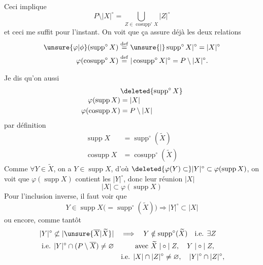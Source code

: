 \clearpage
{}

Ceci implique
\[
P\setminus|X|^{\circ}=\bigcup_{Z\in\operatorname{cosupp}^{\circ}X}|Z|^{\circ}
\]
et ceci me suffit pour l'instant. On voit que ça assure déjà les deux relations
\[
\begin{aligned}
\unsure{\varphi|\phi}(\operatorname{supp}^{\circ}X)&\overset{\mathrm{def}}{=}\unsure{\lvert}\operatorname{supp}^{\circ}X|^{\circ}=|X|^{\circ}\\
\varphi(\operatorname{cosupp}^{\circ}X)&\overset{\mathrm{def}}{=}|\operatorname{cosupp}^{\circ}X|^{\circ}=P\setminus|X|^{\circ}.
\end{aligned}
\]

 Je dis qu'on  aussi
\[
\begin{aligned}
&\deleted{\operatorname{supp}^{\circ}X}\\[-2pt]
\varphi(\operatorname{supp}X)&=|X|\\
\varphi(\operatorname{cosupp}X)&=P\setminus|X|
\end{aligned}
\]
  par définition
\[
\begin{aligned}
\operatorname{supp}X&=\operatorname{supp}^{\circ}(\widetilde X)\\
\operatorname{cosupp}X&=\operatorname{cosupp}^{\circ}(\widetilde X)
\end{aligned}
\]
Comme  $\forall Y\in\widetilde X$, on a $Y\in\operatorname{supp}X$, d'où $\deleted{\varphi(Y)\subset}|Y|^{\circ}\subset\varphi(\operatorname{supp}X)$, on voit que $\varphi(\operatorname{supp}X)$ contient les $|Y|^{\circ}$, donc leur réunion $|X|$
\[
|X|\subset\varphi(\operatorname{supp}X)
\]
Pour l'inclusion inverse, il faut voir que
\[
Y\in\operatorname{supp}X\bigl(=\operatorname{supp}^{\circ}(\widetilde X)\bigr)\Longrightarrow|Y|^{\circ}\subset|X|
\]
ou encore, comme tantôt
\[
\begin{aligned}
|Y|^{\circ}\not\subset|\unsure{\overline X|\widetilde X}|\quad&\Longrightarrow\quad Y\notin\operatorname{supp}^{\circ}(\widetilde X)\quad\text{i.e. }\exists Z\\
\text{i.e. }|Y|^{\circ}\cap(P\setminus\overline X)\neq\varnothing\quad&\qquad\text{avec }\widetilde X\mathrel{|\circ|}Z,\quad Y\mathrel{|\circ|}Z,\\
&\text{i.e. }|X|\cap|Z|^{\circ}\neq\varnothing,\quad |Y|^{\circ}\cap|Z|^{\circ},
\end{aligned}
\]
